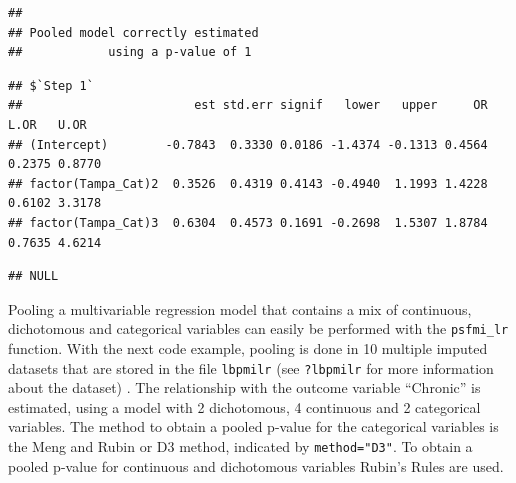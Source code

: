 \documentclass[
]{book}
\newenvironment{Shaded}{\begin{snugshade}}{\end{snugshade}}
\newcommand{\NormalTok}[1]{#1}
\newcommand{\OperatorTok}[1]{\textcolor[rgb]{0.81,0.36,0.00}{\textbf{#1}}}
\begin{document}
\begin{verbatim}
## 
## Pooled model correctly estimated
##            using a p-value of 1
\end{verbatim}

\begin{Shaded}
\end{Shaded}

\begin{verbatim}
## $`Step 1`
##                        est std.err signif   lower   upper     OR   L.OR   U.OR
## (Intercept)        -0.7843  0.3330 0.0186 -1.4374 -0.1313 0.4564 0.2375 0.8770
## factor(Tampa_Cat)2  0.3526  0.4319 0.4143 -0.4940  1.1993 1.4228 0.6102 3.3178
## factor(Tampa_Cat)3  0.6304  0.4573 0.1691 -0.2698  1.5307 1.8784 0.7635 4.6214
\end{verbatim}

\begin{Shaded}
\end{Shaded}

\begin{verbatim}
## NULL
\end{verbatim}

Pooling a multivariable regression model that contains a mix of continuous, dichotomous and categorical variables can easily be performed with the \texttt{psfmi\_lr} function. With the next code example, pooling is done in 10 multiple imputed datasets that are stored in the file \texttt{lbpmilr} (see \texttt{?lbpmilr} for more information about the dataset) . The relationship with the outcome variable ``Chronic'' is estimated, using a model with 2 dichotomous, 4 continuous and 2 categorical variables. The method to obtain a pooled p-value for the categorical variables is the Meng and Rubin or D3 method, indicated by \texttt{method="D3"}. To obtain a pooled p-value for continuous and dichotomous variables Rubin's Rules are used.
\end{document}
